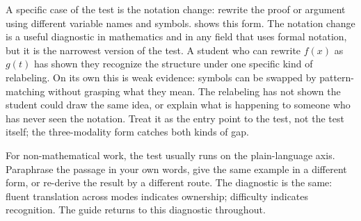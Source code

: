 \documentclass{SIAMbook2023}
\begin{document}
A specific case of the test is the notation change: rewrite the proof or argument using different variable names and symbols.  shows this form. The notation change is a useful diagnostic in mathematics and in any field that uses formal notation, but it is the narrowest version of the test. A student who can rewrite $f(x)$ as $g(t)$ has shown they recognize the structure under one specific kind of relabeling. On its own this is weak evidence: symbols can be swapped by pattern-matching without grasping what they mean. The relabeling has not shown the student could draw the same idea, or explain what is happening to someone who has never seen the notation. Treat it as the entry point to the test, not the test itself; the three-modality form catches both kinds of gap.

For non-mathematical work, the test usually runs on the plain-language axis. Paraphrase the passage in your own words, give the same example in a different form, or re-derive the result by a different route. The diagnostic is the same: fluent translation across modes indicates ownership; difficulty indicates recognition. The guide returns to this diagnostic throughout.
\end{document}
